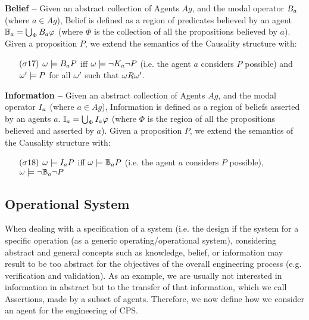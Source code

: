 \begin{definition}{\bf Belief --}\label{def:belief}
	Given an abstract collection of Agents $Ag$, and the modal operator
	$B_{a}$ (where $a\in Ag$), Belief is defined as a region 
	of predicates believed by an agent $\mathbb{B}_{a}=\bigcup_\Phi B_{a}\varphi$
	(where $\Phi$ is the collection of all the propositions believed by $a$).
	Given a proposition $P$, we extend the semantics of the Causality structure with:
	\begin{enumerate}[noitemsep]
		\item[$(\sigma17)$] $\omega\models B_{a}P$ iff
			$\omega\models\neg K_{a}\neg P$ (i.e. the agent $a$ considers $P$ possible) 
			and $\omega'\models P$ for all
			$\omega'$ such that $\omega R\omega'$.
	\end{enumerate}
\end{definition}

\begin{definition}{\bf Information --}\label{def:information}
	Given an abstract collection of Agents $Ag$, and the modal operator
	$I_{a}$ (where $a\in Ag$), Information is defined as a region 
	of beliefs asserted by an agents $a$.
	$\mathbb{I}_{a}=\bigcup_\Phi I_{a}{\varphi}$
	(where $\Phi$ is the region of all the propositions believed and asserted by $a$).
	Given a proposition $P$, we extend the semantics of the Causality structure with:
	\begin{enumerate}[noitemsep]
		\item[$(\sigma18)$] $\omega\models I_{a}P$ iff
			$\omega\models\mathbb{B}_{a}{P}$ (i.e. the agent $a$ considers $P$ possible), 
			$\omega\models\neg\mathbb{B}_{a}{\neg P}$%
	\end{enumerate}
\end{definition}

\subsection{Operational System}\label{sec:engsystemstate}
When dealing with a specification of a system (i.e. the design if the system
for a specific operation (as a generic operating/operational system),
considering abstract and general concepts such as knowledge, belief, or
information may result to be too abstract for the objectives of the overall engineering
process (e.g. verification and validation).
As an example, we are usually not
interested in information in abstract but to the transfer of that
information, which we call Assertions, made by a subset of agents. 
Therefore, we now define how we consider an agent for the engineering
of CPS.


